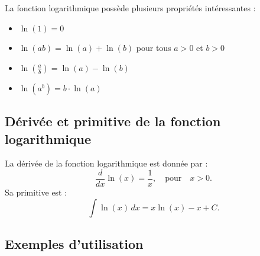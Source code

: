 \documentclass{article}
\begin{document}
	                                                                    La fonction logarithmique possède plusieurs propriétés intéressantes :
	                                                                    \begin{itemize}
	                                                                    	\item \( \ln(1) = 0 \)
	                                                                    	\item \( \ln(ab) = \ln(a) + \ln(b) \) pour tous \( a > 0 \) et \( b > 0 \)
	                                                                    	\item \( \ln\left(\frac{a}{b}\right) = \ln(a) - \ln(b) \)
	                                                                    	\item \( \ln(a^b) = b \cdot \ln(a) \)
	                                                                    \end{itemize}
	                                                                    
	                                                                    \subsection{Dérivée et primitive de la fonction logarithmique}
	                                                                    
	                                                                    La dérivée de la fonction logarithmique est donnée par :
	                                                                    \[
	                                                                    \frac{d}{dx} \ln(x) = \frac{1}{x}, \quad \text{pour} \quad x > 0.
	                                                                    \]
	                                                                    Sa primitive est :
	                                                                    \[
	                                                                    \int \ln(x) \, dx = x \ln(x) - x + C.
	                                                                    \]
	                                                                    
	                                                                    \subsection{Exemples d'utilisation}
	                                                                    
\end{document}
